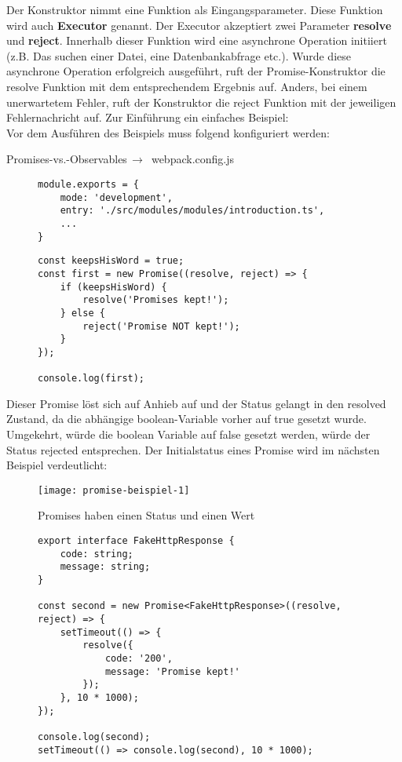 Der Konstruktor nimmt eine Funktion als Eingangsparameter. Diese Funktion wird auch \textbf{Executor} genannt.\cite{promise-executor} Der Executor akzeptiert zwei Parameter \textbf{resolve} und \textbf{reject}. Innerhalb dieser Funktion wird eine asynchrone Operation initiiert (z.B. Das suchen einer Datei, eine Datenbankabfrage etc.). Wurde diese asynchrone Operation erfolgreich ausgeführt, ruft der Promise-Konstruktor die resolve Funktion mit dem entsprechendem Ergebnis auf. Anders, bei einem unerwartetem Fehler, ruft der Konstruktor die reject Funktion mit der jeweiligen Fehlernachricht auf. Zur Einführung ein einfaches Beispiel:\\

\noindent
Vor dem Ausführen des Beispiels muss folgend konfiguriert werden:

 \begin{center}
     Promises-vs.-Observables$\,\to\,$ webpack.config.js
 \end{center}

\begin{figure}[H]
\begin{lstlisting}
module.exports = {
    mode: 'development',
    entry: './src/modules/modules/introduction.ts',
    ...
}
\end{lstlisting}
\end{figure}

\begin{figure}[H]
\begin{lstlisting}
const keepsHisWord = true;
const first = new Promise((resolve, reject) => {
    if (keepsHisWord) {
        resolve('Promises kept!');
    } else {
        reject('Promise NOT kept!');
    }
});

console.log(first);
\end{lstlisting}
\end{figure}

\noindent
Dieser Promise löst sich auf Anhieb auf und der Status gelangt in den resolved Zustand, da die abhängige boolean-Variable vorher auf true gesetzt wurde. Umgekehrt, würde die boolean Variable auf false gesetzt werden, würde der Status rejected entsprechen. Der Initialstatus eines Promise wird im nächsten Beispiel verdeutlicht:

\begin{figure}[H]
\centering
\texttt{[image: promise-beispiel-1]}
\caption{Promises haben einen Status und einen Wert}
\end{figure}

\begin{figure}[H]
\begin{lstlisting}
export interface FakeHttpResponse {
    code: string;
    message: string;
}

const second = new Promise<FakeHttpResponse>((resolve, reject) => {
    setTimeout(() => {
        resolve({
            code: '200',
            message: 'Promise kept!'
        });
    }, 10 * 1000);
});

console.log(second);
setTimeout(() => console.log(second), 10 * 1000);
\end{lstlisting}
\end{figure}

